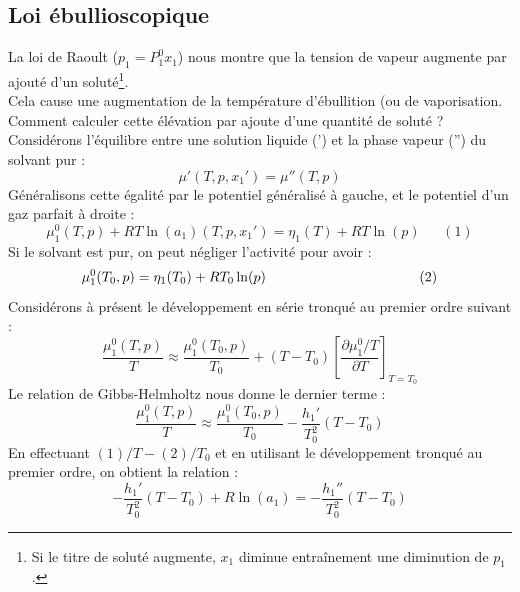 \documentclass[11pt, a4paper, openany]{book}
\begin{document}
		\subsection{Loi ébullioscopique}
		La loi de Raoult ($p_1 = P_1^0x_1$) nous montre que la tension de vapeur augmente par ajouté d'un soluté\footnote{Si le titre de soluté augmente, $x_1$ diminue entraînement une diminution de $p_1$.}. \\
		Cela cause une augmentation de la température d'ébullition (ou de vaporisation. Comment calculer cette élévation par ajoute d'une quantité de soluté ? Considérons l'équilibre entre une solution liquide (') et la phase vapeur ('') du solvant pur :
		\begin{equation}
			\mu'(T,p,x_1') = \mu ''(T,p)
		\end{equation}
		Généralisons cette égalité par le potentiel généralisé à gauche, et le potentiel d'un gaz parfait à droite :
		\begin{equation}
			\mu_1^0(T,p) + RT\ln(a_1)(T,p,x_1') = \eta_1(T) + RT\ln(p)\ \ \ \ \ \ \ (1)
		\end{equation}
		Si le solvant est pur, on peut négliger l'activité pour avoir : 
		\begin{equation}
			\mu_1^0(T_0,p) = \eta_1(T_0) + RT_0\ln(p)\ \ \ \ \ \ \ \ \ \ \ \ \ \ \ \ \ \ \ \ \ \  \ \ \ \ \ \\ \ \ \ \ \ \ \ (2)
		\end{equation}
		Considérons à présent le développement en série tronqué au premier ordre suivant : 
		\begin{equation}
			\frac{\mu_1^0(T,p)}{T} \approx \frac{\mu_1^0(T_0,p)}{T_0} + (T-T_0)\left[\frac{\partial \mu_1^0 / T}{\partial T}\right]_{T = T_0}
		\end{equation}
		Le relation de Gibbs-Helmholtz nous donne le dernier terme :
		\begin{equation}
			\frac{\mu_1^0(T,p)}{T} \approx \frac{\mu_1^0(T_0,p)}{T_0}- \frac{h_1'}{T_0^2} (T-T_0)
		\end{equation}
		En effectuant $(1)/T - (2)/T_0$ et en utilisant le développement tronqué au premier ordre, on obtient la relation :
		\begin{equation}
			-\frac{h_1'}{T_0^2}(T-T_0) + R\ln(a_1) = -\frac{h_1''}{T_0^2}(T-T_0)
		\end{equation}
		
\end{document}
